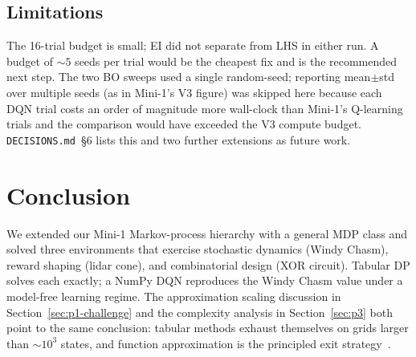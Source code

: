 \documentclass[11pt,letterpaper]{article}
\begin{document}
\subsection{Limitations}
The 16-trial budget is small; EI did not separate from LHS in either run. A budget of $\sim\!5$ seeds per trial would be the cheapest fix and is the recommended next step. The two BO sweeps used a single random-seed; reporting mean$\pm$std over multiple seeds (as in Mini-1's V3 figure) was skipped here because each DQN trial costs an order of magnitude more wall-clock than Mini-1's Q-learning trials and the comparison would have exceeded the V3 compute budget. \texttt{DECISIONS.md}~\S{}6 lists this and two further extensions as future work.

\section{Conclusion}
We extended our Mini-1 Markov-process hierarchy with a general MDP class and solved three environments that exercise stochastic dynamics (Windy Chasm), reward shaping (lidar cone), and combinatorial design (XOR circuit). Tabular DP solves each exactly; a NumPy DQN reproduces the Windy Chasm value under a model-free learning regime. The approximation scaling discussion in Section~\ref{sec:p1-challenge} and the complexity analysis in Section~\ref{sec:p3} both point to the same conclusion: tabular methods exhaust themselves on grids larger than $\sim\!10^{3}$ states, and function approximation is the principled exit strategy~\cite{bertsekas1996neuro,mnih2015human}.
\end{document}
